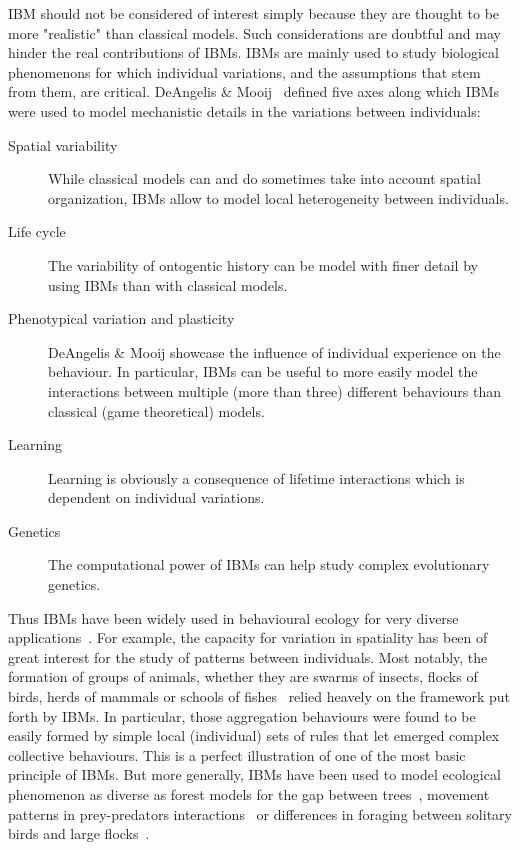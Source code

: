     IBM should not be considered of interest simply because they are thought to be more "realistic" than classical models. Such considerations are doubtful and may hinder the real contributions of IBMs. IBMs are mainly used to study biological phenomenons for which individual variations, and the assumptions that stem from them, are critical. DeAngelis & Mooij~\cite{DeAngelis2005} defined five axes along which IBMs were used to model mechanistic details in the variations between individuals:

    \begin{description}
        \item[Spatial variability] {While classical models can and do sometimes take into account spatial organization, IBMs allow to model local heterogeneity between individuals.}
        \item[Life cycle] {The variability of ontogentic history can be model with finer detail by using IBMs than with classical models.}
        \item[Phenotypical variation and plasticity] {DeAngelis & Mooij showcase the influence of individual experience on the behaviour. In particular, IBMs can be useful to more easily model the interactions between multiple (more than three) different behaviours than classical (game theoretical) models.}
        \item[Learning] {Learning is obviously a consequence of lifetime interactions which is dependent on individual variations.}
        \item[Genetics] {The computational power of IBMs can help study complex evolutionary genetics.}
    \end{description}

    Thus IBMs have been widely used in behavioural ecology for very diverse applications~\cite{DeAngelis2005}. For example, the capacity for variation in spatiality has been of great interest for the study of patterns between individuals. Most notably, the formation of groups of animals, whether they are swarms of insects, flocks of birds, herds of mammals or schools of fishes~\cite{Hurt1992, Gueron1996, Couzin2002} relied heavely on the framework put forth by IBMs. In particular, those aggregation behaviours were found to be easily formed by simple local (individual) sets of rules that let emerged complex collective behaviours. This is a perfect illustration of one of the most basic principle of IBMs. But more generally, IBMs have been used to model ecological phenomenon as diverse as forest models for the gap between trees~\cite{Botkin1972}, movement patterns in prey-predators interactions~\cite{Smith1991} or differences in foraging between solitary birds and large flocks~\cite{Toquenaga1995}.

